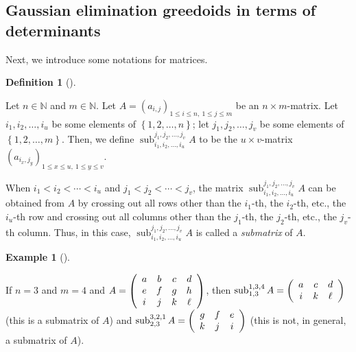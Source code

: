 \documentclass[numbers=enddot,12pt,final,onecolumn,notitlepage]{scrartcl}%
\theoremstyle{definition}
\newtheorem{defi}[theo]{Definition}
\newenvironment{definition}[1][]
{\begin{defi}[#1]\begin{leftbar}}
{\end{leftbar}\end{defi}}
\newtheorem{exam}[theo]{Example}
\newenvironment{example}[1][]
{\begin{exam}[#1]\begin{leftbar}}
{\end{leftbar}\end{exam}}
\renewcommand{\leq}{\leqslant}
\theoremstyle{plainsl}
\begin{document}
\subsection{Gaussian elimination greedoids in terms of determinants}

Next, we introduce some notations for matrices.

\begin{definition}
\label{def.submatrix}Let $n\in\mathbb{N}$ and $m\in\mathbb{N}$. Let $A=\left(
a_{i,j}\right)  _{1\leq i\leq n,\ 1\leq j\leq m}$ be an $n\times m$-matrix.
Let $i_{1},i_{2},\ldots,i_{u}$ be some elements of $\left\{  1,2,\ldots
,n\right\}  $; let $j_{1},j_{2},\ldots,j_{v}$ be some elements of $\left\{
1,2,\ldots,m\right\}  $. Then, we define $\operatorname*{sub}\nolimits_{i_{1}%
,i_{2},\ldots,i_{u}}^{j_{1},j_{2},\ldots,j_{v}}A$ to be the $u\times v$-matrix
$\left(  a_{i_{x},j_{y}}\right)  _{1\leq x\leq u,\ 1\leq y\leq v}$.

When $i_{1}<i_{2}<\cdots<i_{u}$ and $j_{1}<j_{2}<\cdots<j_{v}$, the matrix
$\operatorname*{sub}\nolimits_{i_{1},i_{2},\ldots,i_{u}}^{j_{1},j_{2}%
,\ldots,j_{v}}A$ can be obtained from $A$ by crossing out all rows other than
the $i_{1}$-th, the $i_{2}$-th, etc., the $i_{u}$-th row and crossing out all
columns other than the $j_{1}$-th, the $j_{2}$-th, etc., the $j_{v}$-th
column. Thus, in this case, $\operatorname*{sub}\nolimits_{i_{1},i_{2}%
,\ldots,i_{u}}^{j_{1},j_{2},\ldots,j_{v}}A$ is called a \textit{submatrix} of
$A$.
\end{definition}

\begin{example}
If $n=3$ and $m=4$ and $A=\left(
\begin{array}
[c]{cccc}%
a & b & c & d\\
e & f & g & h\\
i & j & k & \ell
\end{array}
\right)  $, then $\operatorname*{sub}\nolimits_{1,3}^{1,3,4}A=\left(
\begin{array}
[c]{ccc}%
a & c & d\\
i & k & \ell
\end{array}
\right)  $ (this is a submatrix of $A$) and $\operatorname*{sub}%
\nolimits_{2,3}^{3,2,1}A=\left(
\begin{array}
[c]{ccc}%
g & f & e\\
k & j & i
\end{array}
\right)  $ (this is not, in general, a submatrix of $A$).
\end{example}
\end{document}
